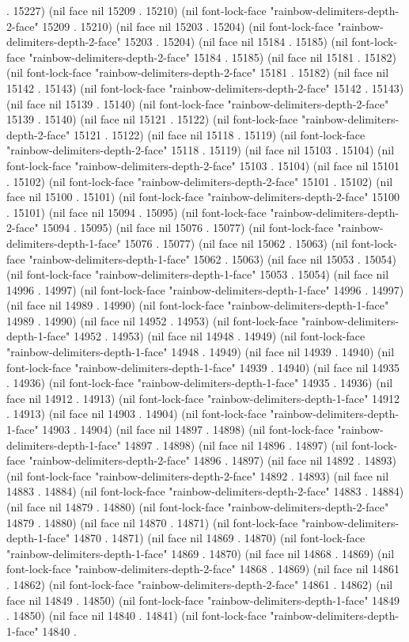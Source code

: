 . 15227) (nil face nil 15209 . 15210) (nil font-lock-face "rainbow-delimiters-depth-2-face" 15209 . 15210) (nil face nil 15203 . 15204) (nil font-lock-face "rainbow-delimiters-depth-2-face" 15203 . 15204) (nil face nil 15184 . 15185) (nil font-lock-face "rainbow-delimiters-depth-2-face" 15184 . 15185) (nil face nil 15181 . 15182) (nil font-lock-face "rainbow-delimiters-depth-2-face" 15181 . 15182) (nil face nil 15142 . 15143) (nil font-lock-face "rainbow-delimiters-depth-2-face" 15142 . 15143) (nil face nil 15139 . 15140) (nil font-lock-face "rainbow-delimiters-depth-2-face" 15139 . 15140) (nil face nil 15121 . 15122) (nil font-lock-face "rainbow-delimiters-depth-2-face" 15121 . 15122) (nil face nil 15118 . 15119) (nil font-lock-face "rainbow-delimiters-depth-2-face" 15118 . 15119) (nil face nil 15103 . 15104) (nil font-lock-face "rainbow-delimiters-depth-2-face" 15103 . 15104) (nil face nil 15101 . 15102) (nil font-lock-face "rainbow-delimiters-depth-2-face" 15101 . 15102) (nil face nil 15100 . 15101) (nil font-lock-face "rainbow-delimiters-depth-2-face" 15100 . 15101) (nil face nil 15094 . 15095) (nil font-lock-face "rainbow-delimiters-depth-2-face" 15094 . 15095) (nil face nil 15076 . 15077) (nil font-lock-face "rainbow-delimiters-depth-1-face" 15076 . 15077) (nil face nil 15062 . 15063) (nil font-lock-face "rainbow-delimiters-depth-1-face" 15062 . 15063) (nil face nil 15053 . 15054) (nil font-lock-face "rainbow-delimiters-depth-1-face" 15053 . 15054) (nil face nil 14996 . 14997) (nil font-lock-face "rainbow-delimiters-depth-1-face" 14996 . 14997) (nil face nil 14989 . 14990) (nil font-lock-face "rainbow-delimiters-depth-1-face" 14989 . 14990) (nil face nil 14952 . 14953) (nil font-lock-face "rainbow-delimiters-depth-1-face" 14952 . 14953) (nil face nil 14948 . 14949) (nil font-lock-face "rainbow-delimiters-depth-1-face" 14948 . 14949) (nil face nil 14939 . 14940) (nil font-lock-face "rainbow-delimiters-depth-1-face" 14939 . 14940) (nil face nil 14935 . 14936) (nil font-lock-face "rainbow-delimiters-depth-1-face" 14935 . 14936) (nil face nil 14912 . 14913) (nil font-lock-face "rainbow-delimiters-depth-1-face" 14912 . 14913) (nil face nil 14903 . 14904) (nil font-lock-face "rainbow-delimiters-depth-1-face" 14903 . 14904) (nil face nil 14897 . 14898) (nil font-lock-face "rainbow-delimiters-depth-1-face" 14897 . 14898) (nil face nil 14896 . 14897) (nil font-lock-face "rainbow-delimiters-depth-2-face" 14896 . 14897) (nil face nil 14892 . 14893) (nil font-lock-face "rainbow-delimiters-depth-2-face" 14892 . 14893) (nil face nil 14883 . 14884) (nil font-lock-face "rainbow-delimiters-depth-2-face" 14883 . 14884) (nil face nil 14879 . 14880) (nil font-lock-face "rainbow-delimiters-depth-2-face" 14879 . 14880) (nil face nil 14870 . 14871) (nil font-lock-face "rainbow-delimiters-depth-1-face" 14870 . 14871) (nil face nil 14869 . 14870) (nil font-lock-face "rainbow-delimiters-depth-1-face" 14869 . 14870) (nil face nil 14868 . 14869) (nil font-lock-face "rainbow-delimiters-depth-2-face" 14868 . 14869) (nil face nil 14861 . 14862) (nil font-lock-face "rainbow-delimiters-depth-2-face" 14861 . 14862) (nil face nil 14849 . 14850) (nil font-lock-face "rainbow-delimiters-depth-1-face" 14849 . 14850) (nil face nil 14840 . 14841) (nil font-lock-face "rainbow-delimiters-depth-1-face" 14840 . 